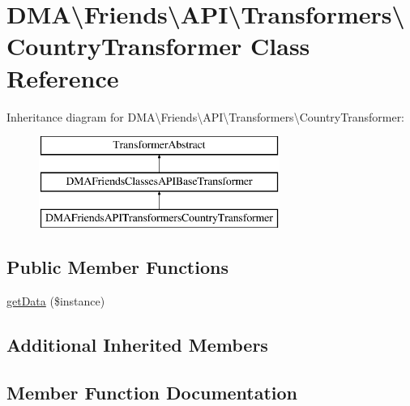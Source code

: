 \hypertarget{classDMA_1_1Friends_1_1API_1_1Transformers_1_1CountryTransformer}{}\section{D\+M\+A\textbackslash{}Friends\textbackslash{}A\+P\+I\textbackslash{}Transformers\textbackslash{}Country\+Transformer Class Reference}
\label{classDMA_1_1Friends_1_1API_1_1Transformers_1_1CountryTransformer}
Inheritance diagram for D\+M\+A\textbackslash{}Friends\textbackslash{}A\+P\+I\textbackslash{}Transformers\textbackslash{}Country\+Transformer\+:\begin{figure}[H]
\begin{center}
\leavevmode
\includegraphics[height=3.000000cm]{d8/d7f/classDMA_1_1Friends_1_1API_1_1Transformers_1_1CountryTransformer}
\end{center}
\end{figure}
\subsection*{Public Member Functions}
\begin{DoxyCompactItemize}
\item 
\hyperlink{classDMA_1_1Friends_1_1API_1_1Transformers_1_1CountryTransformer_aea4d5bbd11286a998dbb6ea7b6879a58}{get\+Data} (\$instance)
\end{DoxyCompactItemize}
\subsection*{Additional Inherited Members}


\subsection{Member Function Documentation}
\hypertarget{classDMA_1_1Friends_1_1API_1_1Transformers_1_1CountryTransformer_aea4d5bbd11286a998dbb6ea7b6879a58}{}
